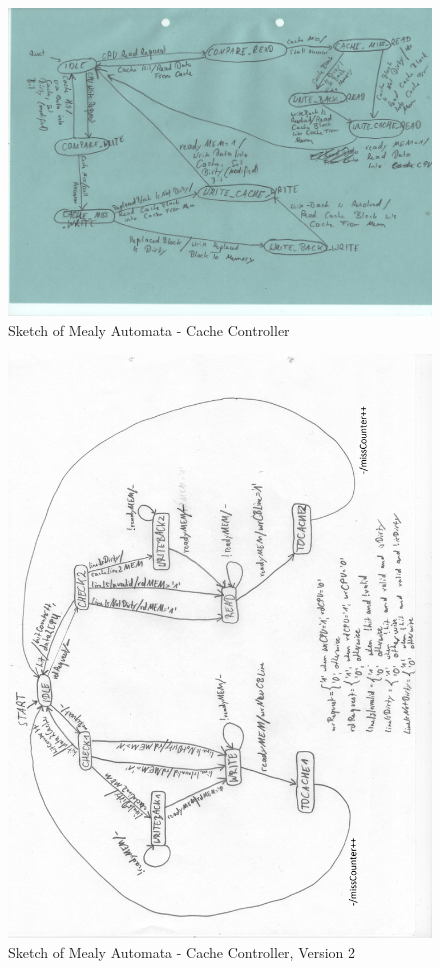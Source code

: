 \begin{figure}
	\centering
	\includegraphics[scale=.8]{pictures/sketch_mealyAutomata}
	\caption{Sketch of Mealy Automata - Cache Controller}
	\label{fig:sketchMealyAutomata}
\end{figure}

\begin{figure}
	\centering
	\includegraphics[scale=.8]{pictures/sketch_mealyAutomata_v2_modified}
	\caption{Sketch of Mealy Automata - Cache Controller, Version 2}
	\label{fig:sketchMealyAutomata2}
\end{figure}